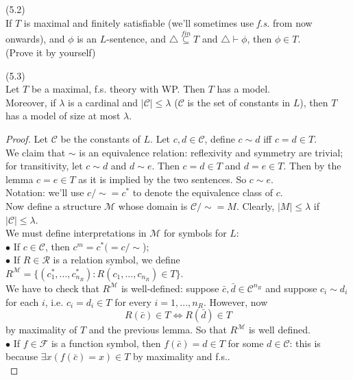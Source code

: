 \documentclass[a4paper]{article}
\begin{document}
\begin{lemma} (5.2)\\
    If $T$ is maximal and finitely satisfiable (we'll sometimes use \emph{f.s.} from now onwards), and $\phi$ is an $L$-sentence, and $\triangle \stackrel{fin}{\subseteq} T$ and $\triangle \vdash \phi$, then $\phi \in T$.\\
    (Prove it by yourself)
\end{lemma}

\begin{lemma} (5.3)\\
    Let $T$ be a maximal, f.s. theory with WP. Then $T$ has a model.\\
    Moreover, if $\lambda$ is a cardinal and $|\mathcal{C}| \leq \lambda$ ($\mathcal{C}$ is the set of constants in $L$), then $T$ has a model of size at most $\lambda$.
    \begin{proof}
        Let $\mathcal{C}$ be the constants of $L$. Let $c,d \in \mathcal{C}$, define $c \sim d$ iff $c=d \in T$.\\
        We claim that $\sim$ is an equivalence relation: reflexivity and symmetry are trivial; for transitivity, let $c \sim d$ and $d \sim e$. Then $c=d \in T$ and $d=e \in T$. Then by the lemma $c=e\in T$ as it is implied by the two sentences. So $c \sim e$.\\
        Notation: we'll use $c/\sim = c^*$ to denote the equivalence class of $c$.\\
        Now define a structure $\mathcal{M}$ whose domain is $\mathcal{C}/\sim = M$. Clearly, $|M| \leq \lambda$ if $|\mathcal{C}| \leq \lambda$.\\
        We must define interpretations in $\mathcal{M}$ for symbols for $L$:\\
        $\bullet$ If $c \in \mathcal{C}$, then $c^m = c^* (=c/\sim$);\\
        $\bullet$ If $R \in \mathcal{R}$ is a relation symbol, we define $R^{\mathcal{M}} = \{(c_1^*,...,c_{n_R}^*):R(c_1,...,c_{n_R}) \in T\}$.\\
        We have to check that $R^{\mathcal{M}}$ is well-defined: suppose $\bar{c},\bar{d} \in \mathcal{C}^{n_R}$ and suppose $c_i \sim d_i$ for each $i$, i.e. $c_i = d_i \in T$ for every $i=1,...,n_R$. However, now
        $$R(\bar{c}) \in T \iff R(\bar{d}) \in T$$
        by maximality of $T$ and the previous lemma. So that $R^{\mathcal{M}}$ is well defined.\\
        $\bullet$ If $f \in \mathcal{F}$ is a function symbol, then $f(\bar{c}) = d \in T$ for some $d \in \mathcal{C}$: this is because $\exists x(f(\bar{c})=x) \in T$ by maximality and f.s..\\

\end{proof}
\end{lemma}
\end{document}
